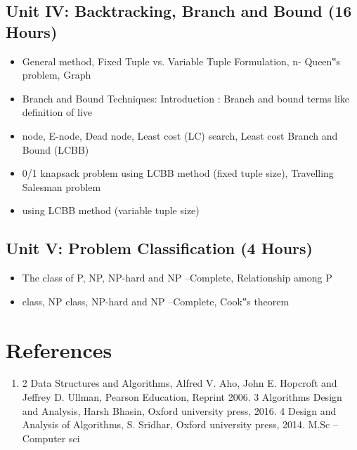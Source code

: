 \documentclass[12pt,a4paper]{article}%
\begin{document}
%
\subsection{Unit IV: Backtracking, Branch and Bound (16 Hours)}%
\label{subsec:UnitIVBacktracking,BranchandBound(16Hours)}%
\begin{itemize}%
\item General method, Fixed Tuple vs. Variable Tuple Formulation, n- Queen‟s problem, Graph%
\item Branch and Bound Techniques: Introduction : Branch and bound terms like definition of live%
\item node, E-node, Dead node, Least cost (LC) search, Least cost Branch and Bound (LCBB)%
\item 0/1 knapsack problem using LCBB method (fixed tuple size), Travelling Salesman problem%
\item using LCBB method (variable tuple size)%
\end{itemize}

%
\subsection{Unit V: Problem Classification (4 Hours)}%
\label{subsec:UnitVProblemClassification(4Hours)}%
\begin{itemize}%
\item The class of P, NP, NP-hard and NP –Complete, Relationship among P%
\item class, NP class, NP-hard and NP –Complete, Cook‟s theorem%
\end{itemize}

%
\section{References}%
\label{sec:References}%
\begin{enumerate}%
\item 2 Data Structures and Algorithms, Alfred V. Aho, John E. Hopcroft and Jeffrey D. Ullman, Pearson
Education, Reprint 2006.
3 Algorithms Design and Analysis, Harsh Bhasin, Oxford university press, 2016.
4 Design and Analysis of Algorithms, S. Sridhar, Oxford university press, 2014.
M.Sc – Computer sci%
\end{enumerate}

%
\end{document}
